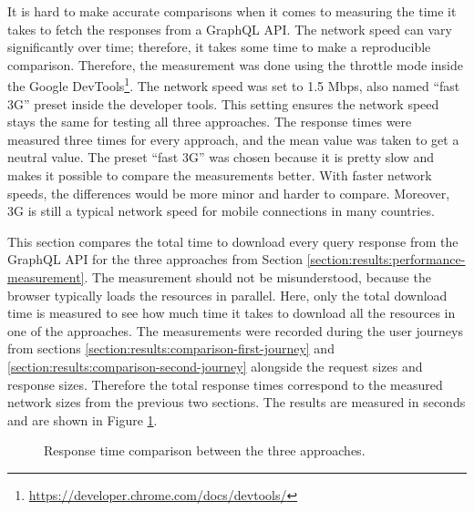 It is hard to make accurate comparisons when it comes to measuring the time it takes to fetch the responses from a GraphQL \ac{API}. The network speed can vary significantly over time; therefore, it takes some time to make a reproducible comparison. Therefore, the measurement was done using the throttle mode inside the Google DevTools\footnote{\url{https://developer.chrome.com/docs/devtools/}}. The network speed was set to 1.5 Mbps, also named \enquote{fast 3G} preset inside the developer tools. This setting ensures the network speed stays the same for testing all three approaches. The response times were measured three times for every approach, and the mean value was taken to get a neutral value. The preset \enquote{fast 3G} was chosen because it is pretty slow and makes it possible to compare the measurements better. With faster network speeds, the differences would be more minor and harder to compare. Moreover, 3G is still a typical network speed for mobile connections in many countries.

\bigskip

\noindent This section compares the total time to download every query response from the GraphQL \ac{API} for the three approaches from Section \ref{section:results:performance-measurement}. The measurement should not be misunderstood, because the browser typically loads the resources in parallel. Here, only the total download time is measured to see how much time it takes to download all the resources in one of the approaches. The measurements were recorded during the user journeys from sections \ref{section:results:comparison-first-journey} and \ref{section:results:comparison-second-journey} alongside the request sizes and response sizes. Therefore the total response times correspond to the measured network sizes from the previous two sections. The results are measured in seconds and are shown in Figure \ref{fig:discussion:response-times}. 

\begin{figure}[H]
  \centering
  \caption{Response time comparison between the three approaches.}\label{fig:discussion:response-times}
\end{figure}

